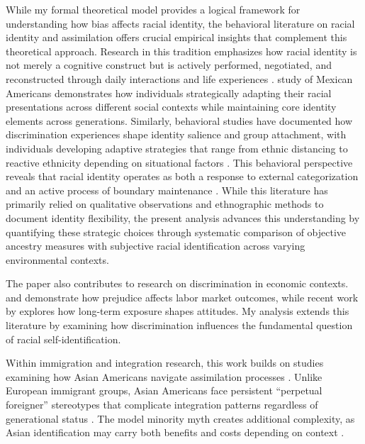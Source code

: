 While my formal theoretical model provides a logical framework for understanding how bias affects racial identity, the behavioral literature on racial identity and assimilation offers crucial empirical insights that complement this theoretical approach. Research in this tradition emphasizes how racial identity is not merely a cognitive construct but is actively performed, negotiated, and reconstructed through daily interactions and life experiences \autocite{waters1990ethnic}. \textcite{telles2008generations} study of Mexican Americans demonstrates how individuals strategically adapting their racial presentations across different social contexts while maintaining core identity elements across generations. Similarly, behavioral studies have documented how discrimination experiences shape identity salience and group attachment, with individuals developing adaptive strategies that range from ethnic distancing to reactive ethnicity depending on situational factors \autocite{zhou1997segmented}. This behavioral perspective reveals that racial identity operates as both a response to external categorization and an active process of boundary maintenance \autocite{cornell2006ethnicity}. While this literature has primarily relied on qualitative observations and ethnographic methods to document identity flexibility, the present analysis advances this understanding by quantifying these strategic choices through systematic comparison of objective ancestry measures with subjective racial identification across varying environmental contexts.

The paper also contributes to research on discrimination in economic contexts. \textcite{bertrandAreEmilyGreg2004} and \textcite{charlesPrejudiceWagesEmpirical2008} demonstrate how prejudice affects labor market outcomes, while recent work by \textcite{bursztynImmigrantNextDoor2022} explores how long-term exposure shapes attitudes. My analysis extends this literature by examining how discrimination influences the fundamental question of racial self-identification.

Within immigration and integration research, this work builds on studies examining how Asian Americans navigate assimilation processes \autocite{abramitzkyCulturalAssimilationAge2016,abramitzkyNationImmigrantsAssimilation2014}. Unlike European immigrant groups, Asian Americans face persistent ``perpetual foreigner'' stereotypes that complicate integration patterns regardless of generational status \autocite{foukaImmigrantsAmericansRace2022}. The model minority myth creates additional complexity, as Asian identification may carry both benefits and costs depending on context \autocite{mengIntermarriageEconomicAssimilation2005}.

